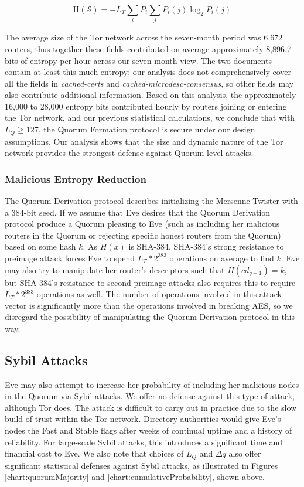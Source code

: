 \begin{equation}
\mathrm{H}(\mathcal{S}) = - L_{T} \sum_{i} P_{i} \sum_{j} P_{i}(j) \log_{2}P_{i}(j)
\label{eq:entropyRate}
\end{equation}

The average size of the Tor network across the seven-month period was 6,672 routers, thus together these fields contributed on average approximately 8,896.7 bits of entropy per hour across our seven-month view. The two documents contain at least this much entropy; our analysis does not comprehensively cover all the fields in \emph{cached-certs} and \emph{cached-microdesc-consensus}, so other fields may also contribute additional information. Based on this analysis, the approximately 16,000 to 28,000 entropy bits contributed hourly by routers joining or entering the Tor network, and our previous statistical calculations, we conclude that with $ L_{Q} \geq 127 $, the Quorum Formation protocol is secure under our design assumptions. Our analysis shows that the size and dynamic nature of the Tor network provides the strongest defense against Quorum-level attacks.

\subsubsection{Malicious Entropy Reduction}

The Quorum Derivation protocol describes initializing the Mersenne Twister with a 384-bit seed. If we assume that Eve desires that the Quorum Derivation protocol produce a Quorum pleasing to Eve (such as including her malicious routers in the Quorum or rejecting specific honest routers from the Quorum) based on some hash $ k $. As $ H(x) $ is SHA-384, SHA-384's strong resistance to preimage attack forces Eve to spend $ L_{T} * 2^{383} $ operations on average to find $ k $. Eve may also try to manipulate her router's descriptors such that $ H(\mathit{cd}_{q+1}) = k $, but SHA-384's resistance to second-preimage attacks also requires this to require $ L_{T} * 2^{383} $ operations as well. The number of operations involved in this attack vector is significantly more than the operations involved in breaking AES, so we disregard the possibility of manipulating the Quorum Derivation protocol in this way.

\subsection{Sybil Attacks}

Eve may also attempt to increase her probability of including her malicious nodes in the Quorum via Sybil attacks. We offer no defense against this type of attack, although Tor does. The attack is difficult to carry out in practice due to the slow build of trust within the Tor network. Directory authorities would give Eve's nodes the Fast and Stable flags after weeks of continual uptime and a history of reliability. For large-scale Sybil attacks, this introduces a significant time and financial cost to Eve. We also note that choices of $ L_{Q} $ and $ \Delta q $ also offer significant statistical defenses against Sybil attacks, as illustrated in Figures  \ref{chart:quorumMajority} and \ref{chart:cumulativeProbability}, shown above.

